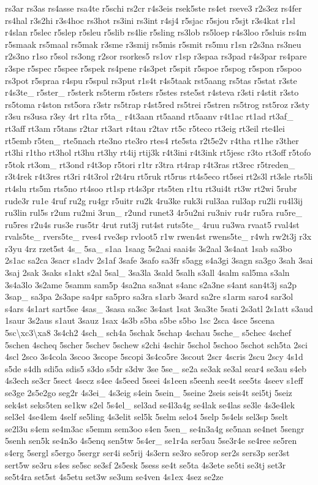 {rs3ar rs3as rs4asse rsa4te r5schi rs2cr r4s3eis rsek5ste rs4et rseve3 r2s3ez rs4fer rs4hal r3s2hi r3s4hoc rs3hot rs3ini rs3int r4sj4 r5sjac r5sjou r5sjt r3s4kat r1sl r4slan r5slec r5slep r5sleu r5slib rs4lie r5sling rs3lob rs5loep r4s3loo r5sluis rs4m r5smaak rs5maal rs5mak r3sme r3smij rs5mis r5smit rs5mu r1sn r2s3na rs3neu r2s3no r1so r5sol rs3ong r2sor rsorkes5 rs1ov r1sp r3spaa rs3pad r4s3par rs4pare r3spe r5spec r5spee r5spek rs4pene r4s3pet r5spit r5spoe r5spog r5spon r5spoo rs3pot r5spraa r4spu r5spul rs3put r1s4t r4s5taak rst5aang rs5tas r5stat r3ste r4s3te\-\_\- r5ster\-\_\- r5sterk rs5term r5sters r5stes rste5st r4steva r3sti r4stit r3sto rs5toma r4ston rst5ora r3str rs5trap r4st5red rs5trei r5stren rs5trog rst5roz r3sty r3su rs3usa r3sy 4rt r1ta r5ta\-\_\- r4t3aan rt5aand rt5aanv r4t1ac rt1ad rt3af\-\_\- rt3aff rt3am r5tans r2tar rt3art r4tau r2tav rt5c r5teco rt3eig rt3eil rte4lei rt5emb r5ten\-\_\- rte5nach rte3no rte3ro rtes4 rte5sta r2t5e2v r4tha rt1he r3ther rt3hi r1tho rt3hol rt3hu rt3hy rt4ij rtij3k r4t3ini r4t3ink rt5jesc r3to rt3off r5tofo r5tok rt3om\-\_\- rt3ond r4t3op r5tori r1tr r3tra rt4rap r4t3ras rt3rec r5treden\-\_\- r3t4rek r4t3res rt3ri r4t3rol r2t4ru rt5ruk rt5rus rt4s5eco rt5sei rt2s3l rt3sle rts5li rt4slu rts5m rts5no rt4soo rt1sp rt4s3pr rts5ten r1tu rt3ui4t rt3w rt2wi 5rubr rude3r ru1e 4ruf ru2g ru4gr r5uitr ru2k 4ru3ke ruk3i rul3aa rul3ap ru2li ru4l3ij ru3lin rul5s r2um ru2mi 3run\-\_\- r2und runet3 4r5u2ni ru3niv ru4r ru5ra ru5re\-\_\- ru5res r2u4s rus3e rus5tr 4rut rut3j rut4st ruts5te\-\_\- 4ruu ru3wa rvaat5 rval4st rvals5te\-\_\- rvers5te\-\_\- rves4 rve3sp rvloot5 r1w rwen4st rwens5te\-\_\- r4wh rw2t3j r3x r3yu 4rz rzet5st 4s\-\_\- 5sa\-\_\- s1aa 1saag 5s2aai saai4s 3s2aal 3s4aat 1sab sa3bo 2s1ac sa2ca 3sacr s1adv 2s1af 3safe 3safo sa3fr s5agg s4a3gi 3sagn sa3go 3sah 3sai 3saj 2sak 3saks s1akt s2al 5sal\-\_\- 3sa3la 3sald 5salh s3all 4salm sal5ma s3aln 3s4a3lo 3s2ame 5samm sam5p 4sa2na sa3nat s4anc s2a3ne s4ant san4t3j sa2p 3sap\-\_\- sa3pa 2s3ape sa4pr sa5pro sa3ra s1arb 3sard sa2re s1arm saro4 sar3ol s4ars 4s1art sart5se 4sas\-\_\- 3sasa sa3sc 3s4ast 1sat 3sa3te 5sati 2s3atl 2s1att s3aud 1saur 3s2aus s1aut 3sauz 1sax 4s3b s5ba s5be s5bo 1sc 2sca 4sce 5scena 5sc\textbackslash{}xc3\textbackslash{}xa8 3s4ch2 4sch\-\_\- sch4a 5schak 5schap 4schau 5sche\-\_\- s5chec 4schef 5schen 4scheq 5scher 5schev 5schew s2chi 4schir 5schol 5schoo 5schot sch5ta 2sci 4scl 2sco 3s4cola 3scoo 3scope 5scopi 3s4co5re 3scout 2scr 4scris 2scu 2scy 4s1d s5de s4dh sdi5a sdis5 s3do s5dr s3dw 3se 5se\-\_\- se2a se3ak se3al sear4 se3au s4eb 4s3ech se3cr 5sect 4secz s4ee 4s5eed 5seei 4s1een s5eenh see4t see5ts 4seev s1eff se3ge 2s5e2go seg2r 4s3ei\-\_\- 4s3eig s4ein 5sein\-\_\- 5seine 2seis seis4t sei5tj 5seiz sek4st seks5ten se1kw s2el 5s4el\-\_\- sel3ad se4l3a4g se4lak se4las se3le 4s3e4lek sel3el 4se4lem 4self se5ling 4s3elit sel5k 5selm selo4 5selp 5s4els sel3sp 5selt se2l3u s4em se4m3ac s5emm sem3oo s4en 5sen\-\_\- se4n3a4g se5nan se4net 5sengr 5senh sen5k se4n3o 4s5enq sen5tw 5s4er\-\_\- se1r4a ser5au 5se3r4e se4ree se5ren s4erg 5sergl s5ergo 5sergr ser4i se5rij 4s3ern se3ro se5rop ser2s sers3p ser3st sert5w se3ru s4es se5sc se3sf 2s5esk 5sess se4t se5ta 4s3ete se5ti se3tj set3r se5t4ra set5st 4s5etu set3w se3um se4ven 4s1ex 4sez se2ze }
